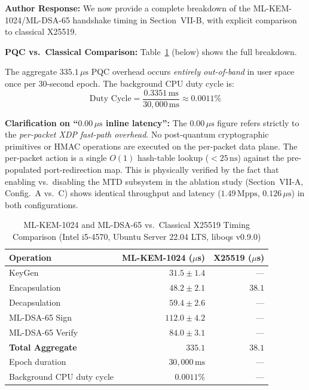 \documentclass[10pt,letterpaper]{article}
\begin{document}
\begin{authorbox}
\textbf{Author Response:}
We now provide a complete breakdown of the ML-KEM-1024/ML-DSA-65 handshake
timing in Section~VII-B, with explicit comparison to classical X25519.

\textbf{PQC vs.\ Classical Comparison:}
Table~\ref{tab:pqc_comparison} (below) shows the full breakdown.

The aggregate $335.1\,\mu\mathrm{s}$ PQC overhead occurs \emph{entirely
out-of-band} in user space once per 30-second epoch. The background CPU duty
cycle is:
\[
  \text{Duty Cycle} = \frac{0.3351\,\mathrm{ms}}{30{,}000\,\mathrm{ms}} \approx 0.0011\%
\]

\textbf{Clarification on ``$0.00\,\mu\mathrm{s}$ inline latency'':}
The $0.00\,\mu\mathrm{s}$ figure refers strictly to the \emph{per-packet XDP
fast-path overhead}. No post-quantum cryptographic primitives or HMAC
operations are executed on the per-packet data plane. The per-packet action is
a single $O(1)$ hash-table lookup ($< 25\,\mathrm{ns}$) against the
pre-populated port-redirection map. This is physically verified by the fact
that enabling vs.\ disabling the MTD subsystem in the ablation study
(Section~VII-A, Config.~A vs.\ C) shows identical throughput and latency
($1.49\,\mathrm{Mpps}$, $0.126\,\mu\mathrm{s}$) in both configurations.
\end{authorbox}

\begin{table}[!ht]
\centering
\caption{ML-KEM-1024 and ML-DSA-65 vs.\ Classical X25519 Timing Comparison
(Intel i5-4570, Ubuntu Server 22.04 LTS, liboqs v0.9.0)}
\label{tab:pqc_comparison}
\begin{tabular}{lrr}
\toprule
\textbf{Operation} & \textbf{ML-KEM-1024 ($\mu$s)} & \textbf{X25519 ($\mu$s)} \\
\midrule
KeyGen                    & $31.5 \pm 1.4$  & --- \\
Encapsulation             & $48.2 \pm 2.1$  & $38.1$ \\
Decapsulation             & $59.4 \pm 2.6$  & --- \\
ML-DSA-65 Sign            & $112.0 \pm 4.2$ & --- \\
ML-DSA-65 Verify          & $84.0 \pm 3.1$  & --- \\
\midrule
\textbf{Total Aggregate}  & $\mathbf{335.1}$ & $38.1$ \\
\midrule
Epoch duration            & $30{,}000\,\mathrm{ms}$ & --- \\
Background CPU duty cycle & $0.0011\%$       & --- \\
\bottomrule
\end{tabular}
\end{table}
\end{document}

